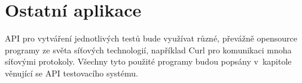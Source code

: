 \section{Ostatní aplikace}
API pro vytváření jednotlivých testů bude využívat různé, převážně opensource programy ze světa síťových technologií, například Curl pro komunikaci mnoha síťovými protokoly. Všechny tyto použité programy budou popsány v~kapitole věnující se API testovacího systému.

\endinput
